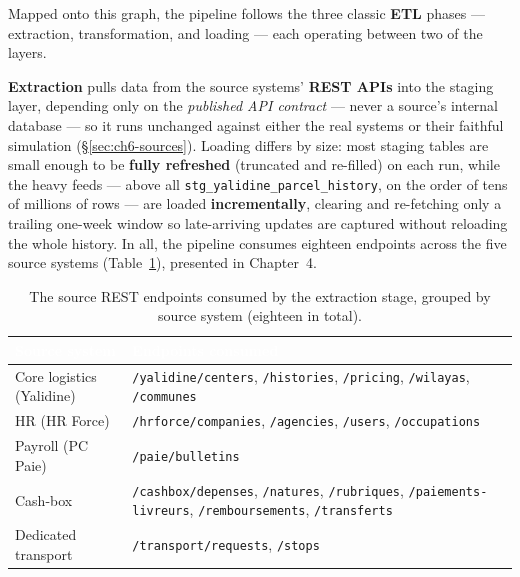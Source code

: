 
Mapped onto this graph, the pipeline follows the three classic \textbf{ETL} phases --- extraction,
transformation, and loading --- each operating between two of the layers.

\textbf{Extraction} pulls data from the source systems' \textbf{REST APIs} into the staging layer,
depending only on the \emph{published API contract} --- never a source's internal database --- so it
runs unchanged against either the real systems or their faithful simulation (\S\ref{sec:ch6-sources}).
Loading differs by size: most staging tables are small enough to be \textbf{fully refreshed} (truncated
and re-filled) on each run, while the heavy feeds --- above all
\texttt{stg\_\allowbreak yalidine\_\allowbreak parcel\_\allowbreak history}, on the order of tens of millions of rows --- are
loaded \textbf{incrementally}, clearing and re-fetching only a trailing one-week window so late-arriving
updates are captured without reloading the whole history. In all, the pipeline consumes eighteen
endpoints across the five source systems (Table~\ref{tab:ch5-endpoints}), presented in Chapter~4.

\begin{table}[H]
\centering
\caption{The source REST endpoints consumed by the extraction stage, grouped by source system (eighteen
in total).}
\label{tab:ch5-endpoints}
\renewcommand{\arraystretch}{1.35}
\begin{tabularx}{\linewidth}{|>{\raggedright\arraybackslash}p{3.6cm}|>{\raggedright\arraybackslash}X|}
\hline
\rowcolor{tblheader}
\textcolor{white}{\textbf{Source system}} & \textcolor{white}{\textbf{Endpoints consumed}} \\
\hline
Core logistics (Yalidine) & \texttt{/yalidine/centers}, \texttt{/histories}, \texttt{/pricing},
\texttt{/wilayas}, \texttt{/communes} \\
HR (HR Force) & \texttt{/hrforce/companies}, \texttt{/agencies}, \texttt{/users},
\texttt{/occupations} \\
Payroll (PC Paie) & \texttt{/paie/bulletins} \\
Cash-box & \texttt{/cashbox/depenses}, \texttt{/natures}, \texttt{/rubriques},
\texttt{/paiements-livreurs}, \texttt{/remboursements}, \texttt{/transferts} \\
Dedicated transport & \texttt{/transport/requests}, \texttt{/stops} \\
\hline
\end{tabularx}
\end{table}

